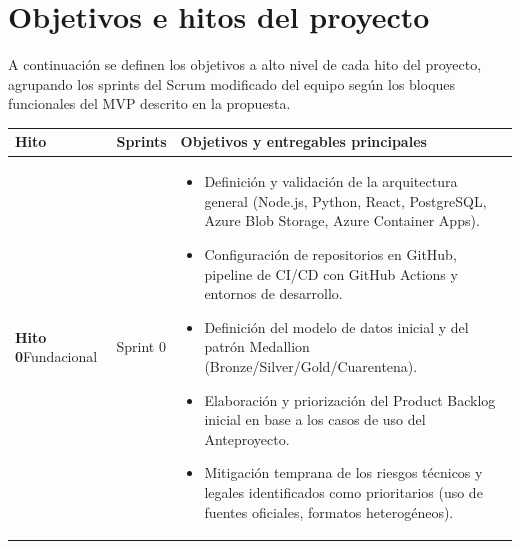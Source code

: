\documentclass[11pt,a4paper]{article}
\begin{document}
\section{Objetivos e hitos del proyecto}
\label{sec:hitos}

A continuaci\'on se definen los objetivos a alto nivel de cada hito del proyecto, agrupando los sprints del Scrum modificado del equipo seg\'un los bloques funcionales del MVP descrito en la propuesta.

\renewcommand{\arraystretch}{1.2}
\begin{longtable}{@{}>{\raggedright\arraybackslash}p{2.6cm} >{\raggedright\arraybackslash}p{2cm} >{\raggedright\arraybackslash}p{\dimexpr\textwidth-2.6cm-2cm-6\tabcolsep\relax}@{}}
\toprule
\textbf{Hito} & \textbf{Sprints} & \textbf{Objetivos y entregables principales} \\
\midrule
\endhead
\bottomrule
\endfoot

\textbf{Hito 0}\newline Fundacional & Sprint 0 &
\begin{itemize}[leftmargin=1em]
  \item Definici\'on y validaci\'on de la arquitectura general (Node.js, Python, React, PostgreSQL, Azure Blob Storage, Azure Container Apps).
  \item Configuraci\'on de repositorios en GitHub, pipeline de CI/CD con GitHub Actions y entornos de desarrollo.
  \item Definici\'on del modelo de datos inicial y del patr\'on Medallion (Bronze/Silver/Gold/Cuarentena).
  \item Elaboraci\'on y priorizaci\'on del Product Backlog inicial en base a los casos de uso del Anteproyecto.
  \item Mitigaci\'on temprana de los riesgos t\'ecnicos y legales identificados como prioritarios (uso de fuentes oficiales, formatos heterog\'eneos).
\end{itemize} \\
\midrule


\end{longtable}
\end{document}
